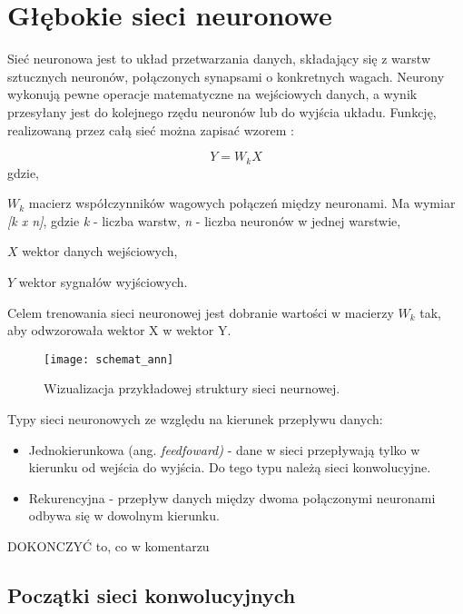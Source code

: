 \section{Głębokie sieci neuronowe}

Sieć neuronowa jest to układ przetwarzania danych, składający się z warstw sztucznych neuronów, połączonych synapsami o konkretnych wagach. Neurony wykonują pewne operacje matematyczne na wejściowych danych, a wynik przesyłany jest do kolejnego rzędu neuronów lub do wyjścia układu. Funkcję, realizowaną przez całą sieć można zapisać wzorem \cite{tadeusiewicz_sn}:

\begin{equation}
Y = W_k X
\end{equation}
gdzie,
\begin{eqwhere}[2cm]
	\item[$W_k$] macierz współczynników wagowych połączeń między neuronami. Ma wymiar \textit{[k x n]}, gdzie \textit{k} - liczba warstw, \textit{n} - liczba neuronów w jednej warstwie,
	\item[$X$] wektor danych wejściowych,
	\item[$Y$] wektor sygnałów wyjściowych.
\end{eqwhere}

Celem trenowania sieci neuronowej jest dobranie wartości w macierzy \textit{$W_k$} tak, aby odwzorowała wektor X w wektor Y. 

\begin{figure}[h]
	\centering
	\centering
		\texttt{[image: schemat\_ann]}	
	\caption{Wizualizacja przykładowej struktury sieci neurnowej.}
\end{figure}

Typy sieci neuronowych ze względu na kierunek przepływu danych:
\begin{itemize}
\item{Jednokierunkowa (ang. \textit{feedfoward)} - dane w sieci przepływają tylko w kierunku od wejścia do wyjścia. Do tego typu należą sieci konwolucyjne.}
\item{Rekurencyjna - przepływ danych między dwoma połączonymi neuronami odbywa się w dowolnym kierunku.}
\end{itemize}

DOKONCZYĆ to, co w komentarzu

\subsection{Początki sieci konwolucyjnych}

